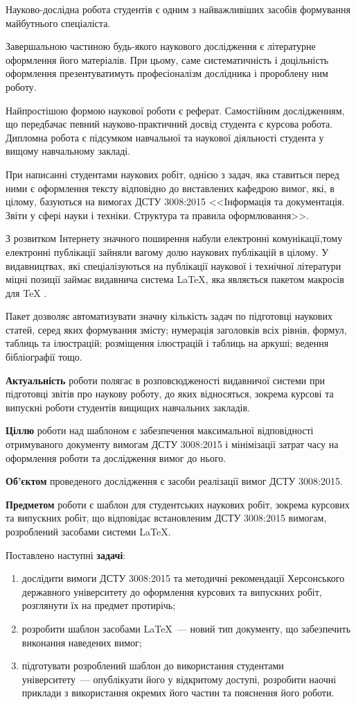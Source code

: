 
Науково-дослідна робота студентів є одним з найважливіших засобів формування майбутнього спеціаліста.

Завершальною частиною будь-якого наукового дослідження є літературне оформлення його матеріалів. При цьому, саме систематичність і доцільність оформлення презентуватимуть професіоналізм дослідника і пророблену ним роботу.

Найпростішою формою наукової роботи є реферат. Самостійним   дослідженням, що передбачає певний науково-практичний досвід студента є курсова робота. Дипломна робота є підсумком навчальної та  наукової діяльності студента у вищому навчальному закладі.

При написанні студентами наукових робіт, однією з задач, яка ставиться перед ними є оформлення тексту відповідно до виставлених кафедрою вимог, які, в цілому, базуються на вимогах ДСТУ 3008:2015 <<Інформація та документація. Звіти у сфері науки і техніки. Структура та правила оформлювання>>.

З розвитком Інтернету значного поширення набули електронні комунікації,тому електронні публікації зайняли вагому долю наукових публікацій в цілому. У видавництвах, які спеціалізуються на публікації наукової і технічної літератури міцні позиції займає видавнича система  \LaTeX{}, яка являється пакетом макросів для \TeX{} \cite{Knuth1984TheTeXbook}.

Пакет дозволяє автоматизувати значну кількість задач по підготовці наукових статей, серед яких формування змісту; нумерація заголовків всіх рівнів, формул, таблиць та ілюстрацій; розміщення ілюстрацій і таблиць на аркуші; ведення бібліографії тощо.

\textbf{Актуальність} роботи полягає в розповсюдженості видавничої системи при підготовці звітів про наукову роботу, до яких відносяться, зокрема курсові та випускні роботи студентів вищищих навчальних закладів.

\textbf{Ціллю} роботи над шаблоном є забезпечення максимальної відповідності отримуваного документу вимогам ДСТУ 3008:2015 і мінімізації затрат часу на оформлення роботи та дослідження вимог до нього.

\textbf{Об'єктом} проведеного дослідження є засоби реалізації вимог ДСТУ 3008:2015. 

\textbf{Предметом} роботи є шаблон для студентських наукових робіт, зокрема курсових та випускних робіт, що відповідає встановленим ДСТУ 3008:2015 вимогам, розроблений засобами системи \LaTeX{}.

Поставлено наступні \textbf{задачі}: 
\begin{enumerate}
\item дослідити вимоги ДСТУ 3008:2015 та методичні рекомендації Херсонського державного університету до оформлення курсових та випускних робіт, розглянути їх на предмет протирічь;
\item розробити шаблон засобами \LaTeX{}~--- новий тип документу, що забезпечить виконання наведених вимог;
\item підготувати розроблений шаблон до використання студентами університету~--- опублікуати його у відкритому доступі, розробити наочні приклади з використання окремих його частин та пояснення його роботи.
\end{enumerate}

